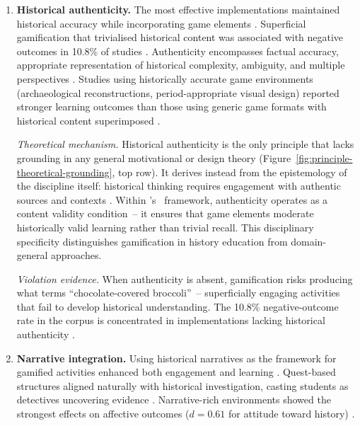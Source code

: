 \begin{enumerate}
\item \textbf{Historical authenticity.} The most effective implementations maintained historical accuracy while incorporating game elements \cite{12Gilbert2019108, 1Barbatsis201159, 51Ardito2007}. Superficial gamification that trivialised historical content was associated with negative outcomes in 10.8\% of studies \cite{47Clara2010156, Oceja2022419}. Authenticity encompasses factual accuracy, appropriate representation of historical complexity, ambiguity, and multiple perspectives \cite{MonteSano2012, Reisman2012}. Studies using historically accurate game environments (archaeological reconstructions, period-appropriate visual design) reported stronger learning outcomes than those using generic game formats with historical content superimposed \cite{1Barbatsis201159, 31DeAmicis2009451, 62Milosz201896}.

\textit{Theoretical mechanism.} Historical authenticity is the only principle that lacks grounding in any general motivational or design theory (Figure~\ref{fig:principle-theoretical-grounding}, top row). It derives instead from the epistemology of the discipline itself: historical thinking requires engagement with authentic sources and contexts \cite{Wineburg2001, MonteSano2012}. Within \citeauthor{Landers2014}'s~\cite{Landers2014} framework, authenticity operates as a content validity condition~-- it ensures that game elements moderate historically valid learning rather than trivial recall. This disciplinary specificity distinguishes gamification in history education from domain-general approaches.

\textit{Violation evidence.} When authenticity is absent, gamification risks producing what \cite{Clark2016} terms ``chocolate-covered broccoli''~-- superficially engaging activities that fail to develop historical understanding. The 10.8\% negative-outcome rate in the corpus is concentrated in implementations lacking historical authenticity \cite{47Clara2010156, Oceja2022419}.

\item \textbf{Narrative integration.} Using historical narratives as the framework for gamified activities enhanced both engagement and learning \cite{12Gilbert2019108, 74Fendt2019, 29Stiso20201165}. Quest-based structures aligned naturally with historical investigation, casting students as detectives uncovering evidence \cite{59Kee2014270, 42Huffer201581}. Narrative-rich environments showed the strongest effects on affective outcomes ($d = 0.61$ for attitude toward history) \cite{15Slater2022, 55Squire2004, SailerHomner2020}.


\end{enumerate}
